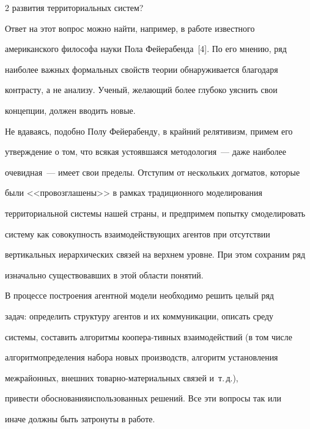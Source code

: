 \begin{multicols}{2}
развития территориальных систем?


  


  Ответ на этот вопрос можно найти, например, в работе известного 


американского философа науки Пола Фейерабенда~[4]. По его мнению, ряд 


наиболее важных формальных свойств теории обнаруживается благодаря 


контрасту, а не анализу. Ученый, желающий более глубоко уяснить свои 


концепции, должен вводить новые.


  


  Не вдаваясь, подобно Полу Фейерабенду, в крайний релятивизм, примем его 


утверждение о том, что всякая устоявшаяся методология~--- даже наиболее 


очевидная~--- имеет свои пределы. Отступим от нескольких догматов, которые 


были <<провозглашены>> в рамках традиционного моделирования 


территориальной системы нашей страны, и предпримем попытку смоделировать 


систему как совокупность взаимодействующих агентов при отсутствии 


вертикальных иерархических связей на верхнем уровне. При этом сохраним ряд 


изначально существовавших в этой области понятий. 


  


  В процессе построения агентной модели необходимо решить целый ряд 


задач: определить структуру агентов и их коммуникации, описать сре\-ду


системы, составить алгоритмы коопера-\linebreak тивных взаимодействий (в том чис\-ле 


алгоритм\linebreak определения набора новых производств, алгоритм установления 


межрайонных, внешних то\-вар\-но-ма\-те\-ри\-а\-льных связей и~т.\,д.), 


привести обоснования\linebreak использованных решений. Все эти вопросы так или 


иначе должны быть затронуты в работе.






\end{multicols}
